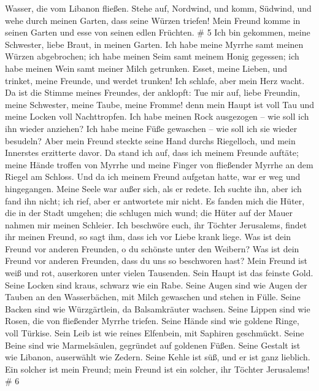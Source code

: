 Wasser, die vom Libanon fließen.  Stehe auf, Nordwind, und
komm, Südwind, und wehe durch meinen Garten, dass seine Würzen triefen!
Mein Freund komme in seinen Garten und esse von seinen edlen Früchten.
\# 5  Ich bin gekommen, meine Schwester, liebe Braut, in
meinen Garten. Ich habe meine Myrrhe samt meinen Würzen abgebrochen; ich
habe meinen Seim samt meinem Honig gegessen; ich habe meinen Wein samt
meiner Milch getrunken. Esset, meine Lieben, und trinket, meine Freunde,
und werdet trunken!  Ich schlafe, aber mein Herz wacht. Da
ist die Stimme meines Freundes, der anklopft: Tue mir auf, liebe
Freundin, meine Schwester, meine Taube, meine Fromme! denn mein Haupt
ist voll Tau und meine Locken voll Nachttropfen.  Ich habe
meinen Rock ausgezogen -- wie soll ich ihn wieder anziehen? Ich habe
meine Füße gewaschen -- wie soll ich sie wieder besudeln? 
Aber mein Freund steckte seine Hand durchs Riegelloch, und mein
Innerstes erzitterte davor.  Da stand ich auf, dass ich
meinem Freunde auftäte; meine Hände troffen von Myrrhe und meine Finger
von fließender Myrrhe an dem Riegel am Schloss.  Und da ich
meinem Freund aufgetan hatte, war er weg und hingegangen. Meine Seele
war außer sich, als er redete. Ich suchte ihn, aber ich fand ihn nicht;
ich rief, aber er antwortete mir nicht.  Es fanden mich die
Hüter, die in der Stadt umgehen; die schlugen mich wund; die Hüter auf
der Mauer nahmen mir meinen Schleier.  Ich beschwöre euch,
ihr Töchter Jerusalems, findet ihr meinen Freund, so sagt ihm, dass ich
vor Liebe krank liege.  Was ist dein Freund vor anderen
Freunden, o du schönste unter den Weibern? Was ist dein Freund vor
anderen Freunden, dass du uns so beschworen hast?  Mein
Freund ist weiß und rot, auserkoren unter vielen Tausenden.
 Sein Haupt ist das feinste Gold. Seine Locken sind kraus,
schwarz wie ein Rabe.  Seine Augen sind wie Augen der
Tauben an den Wasserbächen, mit Milch gewaschen und stehen in Fülle.
 Seine Backen sind wie Würzgärtlein, da Balsamkräuter
wachsen. Seine Lippen sind wie Rosen, die von fließender Myrrhe triefen.
 Seine Hände sind wie goldene Ringe, voll Türkise. Sein
Leib ist wie reines Elfenbein, mit Saphiren geschmückt. 
Seine Beine sind wie Marmelsäulen, gegründet auf goldenen Füßen. Seine
Gestalt ist wie Libanon, auserwählt wie Zedern.  Seine
Kehle ist süß, und er ist ganz lieblich. Ein solcher ist mein Freund;
mein Freund ist ein solcher, ihr Töchter Jerusalems! \# 6 
